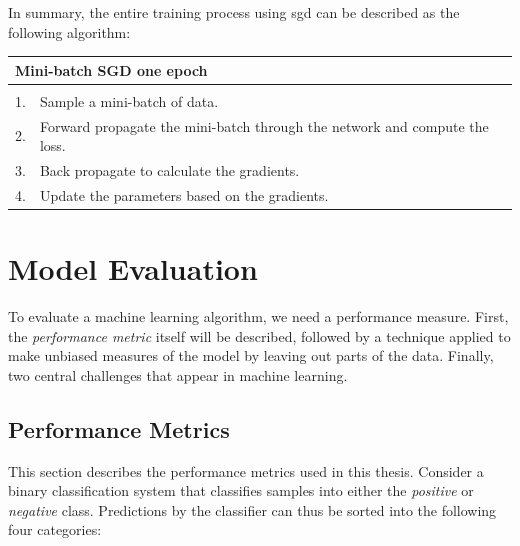     In summary, the entire training process using \gls{sgd} can be described as the following algorithm\cite{farsal2018deep}:
    
    \begin{longtable}{lllllll} \label{sgd algorithm}\\
    \hline
    \multicolumn{7}{l}{Mini-batch SGD one epoch}                                                              \\ \hline
    \endfirsthead
    \endhead
    \hline
    \endfoot
    \endlastfoot
    \multicolumn{7}{l}{Loop:}                                                                       \\
    1.   & \multicolumn{6}{l}{Sample a mini-batch of data.}                                                \\
    2.   & \multicolumn{6}{l}{Forward propagate the mini-batch through the network and compute the loss.} \\
    3.   & \multicolumn{6}{l}{Back propagate to calculate the gradients.}                            \\
    4.   & \multicolumn{6}{l}{Update the parameters based on the gradients.}                         \\ \hline
    \end{longtable}
    
    

\section{Model Evaluation}
    To evaluate a machine learning algorithm, we need a performance measure. First, the \textit{performance metric} itself will be described, followed by a technique applied to make unbiased measures of the model by leaving out parts of the data. Finally, two central challenges that appear in machine learning.
    
    \subsection{Performance Metrics} \label{f1_score}
        This section describes the performance metrics used in this thesis. Consider a binary classification system that classifies samples into either the \textit{positive} or \textit{negative} class. Predictions by the classifier can thus be sorted into the following four categories\cite{powers2020evaluation_f1_recall_precision}:
        
